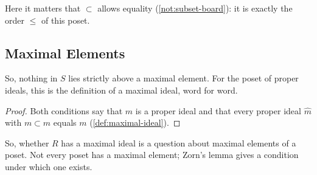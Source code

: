 Here it matters that $\subset$ allows equality (\cref{not:subset-board}): it is exactly the order $\le$ of this poset.

\subsection{Maximal Elements}


So, nothing in $S$ lies strictly above a maximal element. For the poset of proper ideals, this is the definition of a maximal ideal, word for word.


\begin{proof}
Both conditions say that $m$ is a proper ideal and that every proper ideal $\hat{m}$ with $m \subset \hat{m}$ equals $m$ (\cref{def:maximal-ideal}).
\end{proof}

So, whether $R$ has a maximal ideal is a question about maximal elements of a poset. Not every poset has a maximal element; Zorn's lemma gives a condition under which one exists.

